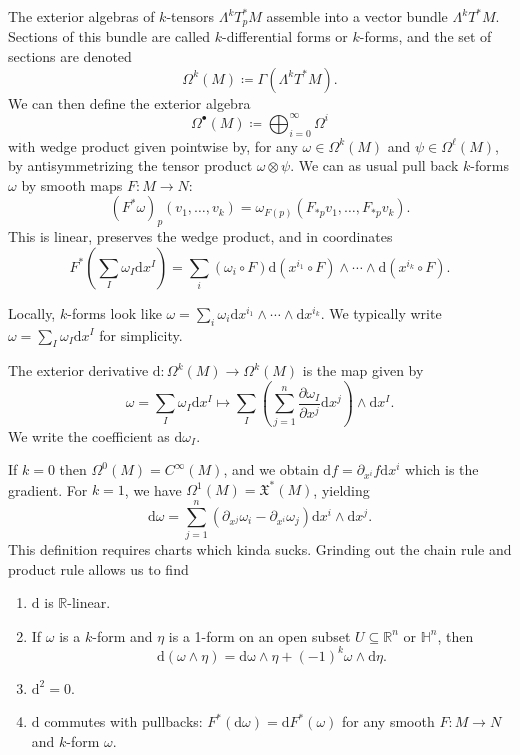 
The exterior algebras of $k$-tensors $\Lambda ^kT^*_pM$ assemble into a vector bundle $\Lambda ^kT^*M$. Sections of this bundle are called $k$-differential forms or $k$-forms, and the set of sections are denoted
\[
	\Omega ^k(M)\coloneqq \Gamma (\Lambda ^kT^*M)
.\]
We can then define the exterior algebra
\[
	\Omega ^{\bullet} (M)\coloneqq \bigoplus_{i=0} ^\infty \Omega ^i
\]
with wedge product given pointwise by, for any $\omega \in \Omega^k(M)$ and $\psi \in \Omega ^\ell (M)$, by antisymmetrizing the tensor product $\omega \otimes \psi $. We can as usual pull back $k$-forms $\omega $ by smooth maps $F : M \to N$:
\[
	(F^*\omega )_p(v_1, \ldots ,v_k)=\omega _{F(p)} (F_{*p} v_1, \ldots ,F_{*p} v_k)
.\]
This is linear, preserves the wedge product, and in coordinates
\[
	F^*\left( \sum_{I} \omega _I\mathrm{d} x^I \right) =\sum_{i} (\omega _i\circ F)\mathrm{d} (x^{i_1}\circ F)\wedge \cdots \wedge \mathrm{d} (x^{i_k} \circ F)
.\]


Locally, $k$-forms look like $\omega =\sum_{i}\omega _i \mathrm{d} x^{i_1} \wedge \cdots \wedge \mathrm{d} x^{i_k} $. We typically write $\omega =\sum_{I} \omega _I\mathrm{d} x^I$ for simplicity.

\begin{definition}\label{kjasd}
	The exterior derivative $\mathrm{d} : \Omega ^k(M) \to \Omega ^k(M)$ is the map given by
	\[
		\omega =\sum_{I} \omega _I \mathrm{d} x^I \mapsto \sum_{I} \left( \sum_{j=1} ^n \frac{\partial \omega _I}{\partial x^j} \mathrm{d} x^j \right) \wedge \mathrm{d} x^I
	.\]
	We write the coefficient as $\mathrm{d} \omega _I$.
\end{definition}

If $k=0$ then $\Omega ^0(M)=C^\infty (M)$, and we obtain $\mathrm{d} f = \partial _{x^i} f \mathrm{d} x^i$ which is the gradient. For $k=1$, we have $\Omega ^1(M)=\mathfrak{X} ^*(M)$, yielding
\[
	\mathrm{d} \omega =\sum_{j=1} ^n \left( \partial _{x^j} \omega _i - \partial _{x^i} \omega _j \right) \mathrm{d} x^i \wedge \mathrm{d} x^j
.\]
This definition requires charts which kinda sucks. Grinding out the chain rule and product rule allows us to find
\begin{proposition}\label{kjjdf}
	\begin{enumerate}
		\item $\mathrm{d}$ is $\mathbb{R} $-linear.
		\item If $\omega $ is a $k$-form and $\eta $ is a 1-form on an open subset $U\subseteq \mathbb{R} ^n$ or $\mathbb{H} ^n$, then
			\[
				\mathrm{d} (\omega \wedge \eta )=\mathrm{d\omega } \wedge \eta +(-1)^k \omega \wedge \mathrm{d} \eta 
			.\]
		\item $\mathrm{d} ^2=0$.
		\item $\mathrm{d} $ commutes with pullbacks: $F^*(\mathrm{d} \omega )=\mathrm{d} F^*(\omega )$ for any smooth $F : M \to N$ and $k$-form $\omega $.
	\end{enumerate}	
\end{proposition}

